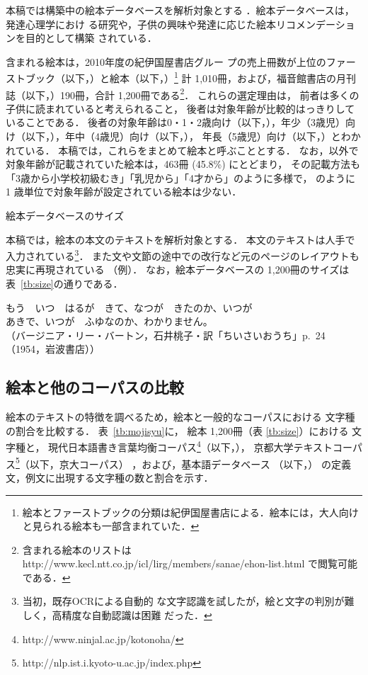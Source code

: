\documentclass[japanese]{jnlp_1.4}
\newcommand{\bccwj}{}
\newcommand{\ehon}{}
\newcommand{\first}{}
\newcommand{\kodomo}{}
\newcommand{\kod}[1]{}
\newcommand{\lxd}{}
\newcommand{\refs}[1]{}
\begin{document}
本稿では構築中の絵本データベースを解析対象とする
\cite{Taira:Fujita:Kobayashi:2012j}．絵本データベースは，発達心理学におけ
る研究や，子供の興味や発達に応じた絵本リコメンデーションを目的として構築
されている．


含まれる絵本は，2010年度の紀伊国屋書店グルー
プの売上冊数が上位のファーストブック（以下，\first{}）と絵本（以下，\ehon）\footnote{
	絵本とファーストブックの分類は紀伊国屋書店による．絵本には，大人向けと見られる絵本も一部含まれていた．}
計 1,010冊，および，福音館書店の月刊誌（以下，\kodomo）190冊，合計 1,200冊である\footnote{含まれる絵本のリストは http://www.kecl.ntt.co.jp/icl/lirg/members/sanae/ehon-list.html で閲覧可能である．}．
これらの選定理由は，
前者は多くの子供に読まれていると考えられること，
後者は対象年齢が比較的はっきりしていることである．
後者の対象年齢は0・1・2歳向け（以下，\kod{012}），年少（3歳児）向け（以下，\kod{3}），年中（4歳児）向け（以下，\kod{4}），
年長（5歳児）向け（以下，\kod{5}）とわかれている．
本稿では，これらをまとめて絵本と呼ぶこととする．
なお，\kodomo 以外で対象年齢が記載されていた絵本は，463冊 (45.8\%) にとどまり，
その記載方法も「3歳から小学校初級むき」「乳児から」「4才から」のように多様で，
\kodomo のように 1 歳単位で対象年齢が設定されている絵本は少ない．

\begin{table}[b]
 \caption{絵本データベースのサイズ}\label{tb:size}

\end{table}

本稿では，絵本の本文のテキストを解析対象とする．
本文のテキストは人手で入力されている\footnote{当初，既存OCRによる自動的
な文字認識を試したが，絵と文字の判別が難しく，高精度な自動認識は困難
だった．}．
また文や文節の途中での改行など元のページのレイアウトも
忠実に再現されている
（例\refs{ex-org}）．
なお，絵本データベースの 1,200冊のサイズは
表~\ref{tb:size}の通りである．
\begin{exe}
 \ex \label{s:ex-org}
もう　いつ　はるが　きて、なつが　きたのか、いつが\\
あきで、いつが　ふゆなのか、わかりません。\\
\small （バージニア・リー・バートン，石井桃子・訳「ちいさいおうち」p.~24（1954，岩波書店））
\end{exe}


\subsection{絵本と他のコーパスの比較}
\label{sec:mojisyu}

絵本のテキストの特徴を調べるため，絵本と一般的なコーパスにおける
文字種の割合を比較する．
表~\ref{tb:mojisyu}に，
絵本 1,200冊（表 \ref{tb:size}）における
文字種と，
現代日本語書き言葉均衡コーパス\footnote{http://www.ninjal.ac.jp/kotonoha/}（以下，\bccwj），
京都大学テキストコーパス\footnote{http://nlp.ist.i.kyoto-u.ac.jp/index.php}（以下，京大コーパス）
，および，基本語データベース\cite{Lexeed:2004j} （以下，\lxd）
の定義文，例文に出現する文字種の数と割合を示す．
\end{document}
